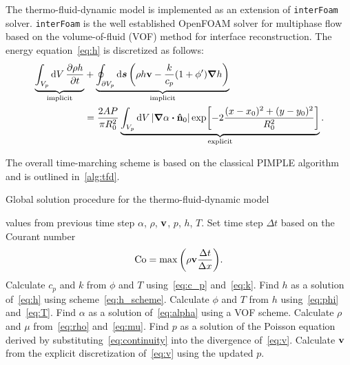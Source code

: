 \documentclass{article}
\newcommand{\OpenFOAM}{OpenFOAM\textregistered\xspace}
\newcommand{\bv}{\vb{v}}
\newcommand{\bn}{\vu{n}}
\newcommand{\intCell}{\int_{V_p} \dd{V}}
\newcommand{\intFaces}{\oint_{\partial V_p} \dd{\vb*{s}}}
\begin{document}
The thermo-fluid-dynamic model is implemented as an extension of \verb+interFoam+ solver.
\verb+interFoam+ is the well established \OpenFOAM solver for multiphase flow
based on the volume-of-fluid (VOF) method for interface reconstruction.
The energy equation~\eqref{eq:h} is discretized as follows:
\begin{equation}\label{eq:h_scheme}
    \begin{aligned}
    \underbrace{
        \intCell \pdv{\rho h}{t}
    }_\text{implicit} &+ \underbrace{
        \intFaces \qty(\rho h\bv - \frac{k}{c_p}(1+\phi')\grad{h})
    }_\text{implicit} \\ &= \frac{2AP}{\pi R_0^2}\underbrace{
        \intCell |\grad\alpha\vdot\bn_0|\exp[-2\frac{(x-x_0)^2 + (y-y_0)^2}{R_0^2}]
    }_\text{explicit}.
    \end{aligned}
\end{equation}

The overall time-marching scheme is based on the classical PIMPLE algorithm
and is outlined in~\ref{alg:tfd}.

\begin{algorithm}[H]
\caption{Global solution procedure for the thermo-fluid-dynamic model}\label{alg:tfd}
\begin{algorithmic}[1]
    \Require values from previous time step $\alpha$, $\rho$, $\bv$, $p$, $h$, $T$.
    \State Set time step $\Delta{t}$ based on the Courant number
    \begin{equation}\label{eq:Courant}
        \mathrm{Co} = \max\qty( \rho\bv\frac{\Delta t}{\Delta x} ).
    \end{equation}
    \State Calculate $c_p$ and $k$ from $\phi$ and $T$ using~\eqref{eq:c_p} and~\eqref{eq:k}.
    \State Find $h$ as a solution of~\eqref{eq:h} using scheme~\eqref{eq:h_scheme}.
    \State Calculate $\phi$ and $T$ from $h$ using~\eqref{eq:phi} and~\eqref{eq:T}.
        \State Find $\alpha$ as a solution of~\eqref{eq:alpha} using a VOF scheme.
        \State Calculate $\rho$ and $\mu$ from~\eqref{eq:rho} and~\eqref{eq:mu}.
            \State Find $p$ as a solution of the Poisson equation derived by substituting~\eqref{eq:continuity}
            into the divergence of~\eqref{eq:v}.
            \State Calculate $\bv$ from the explicit discretization of~\eqref{eq:v} using the updated $p$.
        \EndWhile
    \EndWhile
\end{algorithmic}
\end{algorithm}
\end{document}
